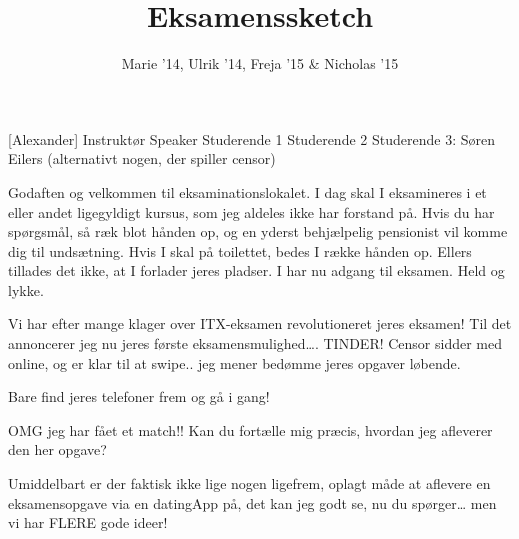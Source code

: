 \documentclass[a4paper,11pt]{article}
\title{Eksamenssketch}
\author{Marie '14, Ulrik '14, Freja '15 \& Nicholas '15}
\begin{document}
\maketitle

\begin{roles}
[Alexander] Instruktør
 Speaker
 Studerende 1
 Studerende 2
 Studerende 3:
 Søren Eilers (alternativt nogen, der spiller censor)
\end{roles}

\begin{props}
\end{props}


\begin{sketch}


 Godaften og velkommen til eksaminationslokalet. I dag skal I eksamineres i et eller andet ligegyldigt kursus, som jeg aldeles ikke har forstand på. 
Hvis du har spørgsmål, så ræk blot hånden op, og en yderst behjælpelig pensionist vil komme dig til undsætning. Hvis I skal på toilettet, bedes I række hånden op. Ellers tillades det ikke, at I forlader jeres pladser. 
I har nu adgang til eksamen. Held og lykke.


 Vi har efter mange klager over ITX-eksamen revolutioneret jeres eksamen! Til det annoncerer jeg nu jeres første eksamensmulighed…. TINDER! Censor sidder med online, og er klar til at swipe.. jeg mener bedømme jeres opgaver løbende.


 Bare find jeres telefoner frem og gå i gang!

 OMG jeg har fået et match!!
  Kan du fortælle mig præcis, hvordan jeg afleverer den her opgave?

 Umiddelbart er der faktisk ikke lige nogen ligefrem, oplagt måde at aflevere en eksamensopgave via en datingApp på, det kan jeg godt se, nu du spørger… men vi har FLERE gode ideer!


\end{sketch}
\end{document}
